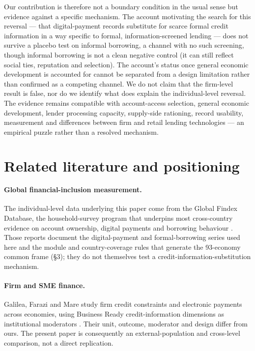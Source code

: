 Our contribution is therefore not a boundary condition in the usual sense but evidence
against a specific mechanism. The account motivating the search for this reversal ---
that digital-payment records substitute for scarce formal credit information in a way
specific to formal, information-screened lending --- does not survive a placebo test on
informal borrowing, a channel with no such screening, though informal borrowing is not a
clean negative control (it can still reflect social ties, reputation and selection). The
account's status once general economic development is accounted for cannot be separated
from a design limitation rather than confirmed as a competing channel. We do not
claim that the firm-level result is false, nor do we identify what does explain the
individual-level reversal. The evidence remains compatible with account-access selection,
general economic development, lender processing capacity, supply-side rationing, record
usability, measurement and differences between firm and retail lending technologies ---
an empirical puzzle rather than a resolved mechanism.

\section{Related literature and positioning}

\paragraph{Global financial-inclusion measurement.} The individual-level data underlying
this paper come from the Global Findex Database, the household-survey program that
underpins most cross-country evidence on account ownership, digital payments and
borrowing behaviour
\citep{DemirgucKuntKlapperSingerAnsar2022,KlapperSingerStaritaNorris2025}. Those reports
document the digital-payment and formal-borrowing series used here and the module and
country-coverage rules that generate the 93-economy common frame (\S3); they do not
themselves test a credit-information-substitution mechanism.

\paragraph{Firm and SME finance.} Galilea, Farazi and Mare study firm credit constraints
and electronic payments across economies, using Business Ready credit-information
dimensions as institutional moderators \citep{GalileaFaraziMare2026}. Their unit, outcome,
moderator and design differ from ours. The present paper is consequently an
external-population and cross-level comparison, not a direct replication.

